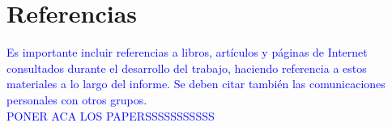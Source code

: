 \documentclass[a4paper]{article}
\begin{document}
\newpage
\section{Referencias}
\textcolor{blue}{Es importante incluir referencias a libros, art\'iculos y p\'aginas de Internet consultados
durante el desarrollo del trabajo, haciendo referencia a estos materiales a lo largo del
informe. Se deben citar tambi\'en las comunicaciones personales con otros grupos.\\
PONER ACA LOS PAPERSSSSSSSSSSS\\
}
\\
\end{document}
